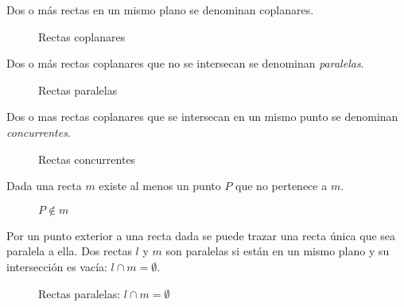 \clearpage

\begin{definition}
Dos o más rectas en un mismo plano se denominan coplanares.

    \begin{figure}[!h]
        \centering
        
        \caption{Rectas coplanares}
        \label{fig:plot27}
    \end{figure}
    
\end{definition}

\begin{definition}
Dos o más rectas coplanares que no se intersecan se denominan \textit{paralelas}.

    \begin{figure}[!h]
        \centering
        
        \caption{Rectas paralelas}
        \label{fig:plot28}
    \end{figure}
    
\end{definition}

\begin{definition}
Dos o mas rectas coplanares que se intersecan en un mismo punto se denominan \textit{concurrentes}.

    \begin{figure}[!h]
        \centering
        
        \caption{Rectas concurrentes}
        \label{fig:plot29}
    \end{figure}

\end{definition}

\clearpage

\begin{postulate}
    Dada una recta $m$ existe al menos un punto $P$ que no pertenece a $m$.
    
    \begin{figure}[h]
        \centering
        
        \caption{$P \notin m$}
        \label{fig:plot2}
    \end{figure}
\end{postulate}

\begin{postulate}
    Por un punto exterior a una recta dada se puede trazar una recta única que sea paralela a ella. Dos rectas $l$ y $m$ son paralelas si están en un mismo plano y su intersección es vacía: $l \cap m = \emptyset$.
    
    \begin{figure}[!h]
        \centering
        
        \caption{Rectas paralelas: $l \cap m = \emptyset$}
        \label{fig:plot15}
    \end{figure}

\end{postulate}

